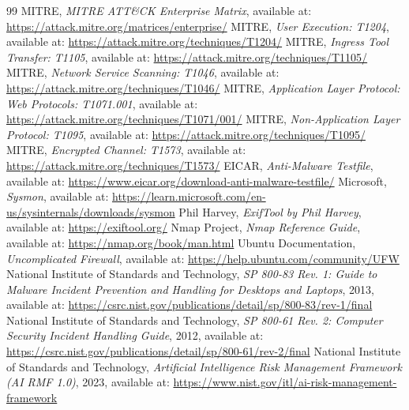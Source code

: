 \begin{thebibliography}{99}
 MITRE, \textit{MITRE ATT\&CK Enterprise Matrix}, available at: \url{https://attack.mitre.org/matrices/enterprise/}
 MITRE, \textit{User Execution: T1204}, available at: \url{https://attack.mitre.org/techniques/T1204/}
 MITRE, \textit{Ingress Tool Transfer: T1105}, available at: \url{https://attack.mitre.org/techniques/T1105/}
 MITRE, \textit{Network Service Scanning: T1046}, available at: \url{https://attack.mitre.org/techniques/T1046/}
 MITRE, \textit{Application Layer Protocol: Web Protocols: T1071.001}, available at: \url{https://attack.mitre.org/techniques/T1071/001/}
 MITRE, \textit{Non-Application Layer Protocol: T1095}, available at: \url{https://attack.mitre.org/techniques/T1095/}
 MITRE, \textit{Encrypted Channel: T1573}, available at: \url{https://attack.mitre.org/techniques/T1573/}
 EICAR, \textit{Anti-Malware Testfile}, available at: \url{https://www.eicar.org/download-anti-malware-testfile/}
 Microsoft, \textit{Sysmon}, available at: \url{https://learn.microsoft.com/en-us/sysinternals/downloads/sysmon}
 Phil Harvey, \textit{ExifTool by Phil Harvey}, available at: \url{https://exiftool.org/}
 Nmap Project, \textit{Nmap Reference Guide}, available at: \url{https://nmap.org/book/man.html}
 Ubuntu Documentation, \textit{Uncomplicated Firewall}, available at: \url{https://help.ubuntu.com/community/UFW}
 National Institute of Standards and Technology, \textit{SP 800-83 Rev. 1: Guide to Malware Incident Prevention and Handling for Desktops and Laptops}, 2013, available at: \url{https://csrc.nist.gov/publications/detail/sp/800-83/rev-1/final}
 National Institute of Standards and Technology, \textit{SP 800-61 Rev. 2: Computer Security Incident Handling Guide}, 2012, available at: \url{https://csrc.nist.gov/publications/detail/sp/800-61/rev-2/final}
 National Institute of Standards and Technology, \textit{Artificial Intelligence Risk Management Framework (AI RMF 1.0)}, 2023, available at: \url{https://www.nist.gov/itl/ai-risk-management-framework}
\end{thebibliography}
